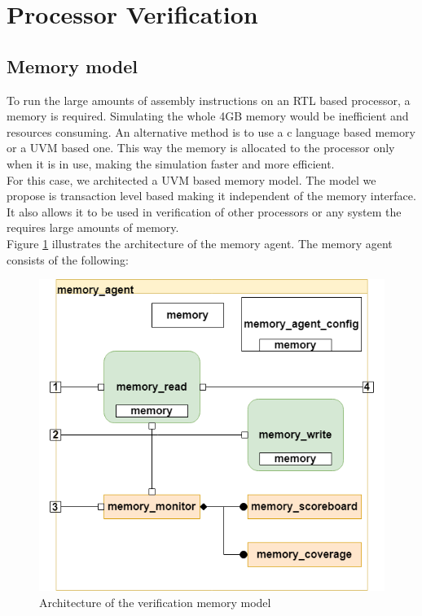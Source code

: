 \documentclass[../main.tex]{subfiles}
\begin{document}
\section{Processor Verification}
\subsection{Memory model}
To run the large amounts of assembly instructions on an RTL based processor, a memory is required. Simulating the whole 4GB memory would be inefficient and resources consuming. An alternative method is to use a c language based memory or a UVM based one. This way the memory is allocated to the processor only when it is in use, making the simulation faster and more efficient.\\
\newline
\noindent For this case, we architected a UVM based memory model. The model we propose is transaction level based making it independent of the memory interface. It also allows it to be used in verification of other processors or any system the requires large amounts of memory.\\
\newline
\noindent Figure \ref{fig:UVM_memory} illustrates the architecture of the memory agent. The memory agent consists of the following:

\begin{figure}[h!]
\centering
\includegraphics[scale = 0.5]{diagrams/UVM_Memory_Model.png}

\caption{Architecture of the verification memory model}
\label{fig:UVM_memory}
\end{figure}
\end{document}
